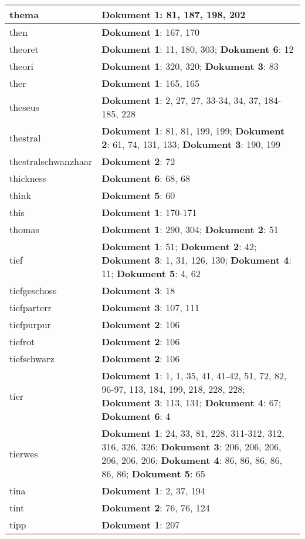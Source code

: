 \documentclass[a5paper]{article}
\begin{document}
\begin{longtable}[l]{|l|p{3in}|}
\hline
thema & \textbf{Dokument 1}: 81, 187, 198, 202 \\
\hline
then & \textbf{Dokument 1}: 167, 170 \\
\hline
theoret & \textbf{Dokument 1}: 11, 180, 303; \textbf{Dokument 6}: 12 \\
\hline
theori & \textbf{Dokument 1}: 320, 320; \textbf{Dokument 3}: 83 \\
\hline
ther & \textbf{Dokument 1}: 165, 165 \\
\hline
theseus & \textbf{Dokument 1}: 2, 27, 27, 33-34, 34, 37, 184-185, 228 \\
\hline
thestral & \textbf{Dokument 1}: 81, 81, 199, 199; \textbf{Dokument 2}: 61, 74, 131, 133; \textbf{Dokument 3}: 190, 199 \\
\hline
thestralschwanzhaar & \textbf{Dokument 2}: 72 \\
\hline
thickness & \textbf{Dokument 6}: 68, 68 \\
\hline
think & \textbf{Dokument 5}: 60 \\
\hline
this & \textbf{Dokument 1}: 170-171 \\
\hline
thomas & \textbf{Dokument 1}: 290, 304; \textbf{Dokument 2}: 51 \\
\hline
tief & \textbf{Dokument 1}: 51; \textbf{Dokument 2}: 42; \textbf{Dokument 3}: 1, 31, 126, 130; \textbf{Dokument 4}: 11; \textbf{Dokument 5}: 4, 62 \\
\hline
tiefgeschoss & \textbf{Dokument 3}: 18 \\
\hline
tiefparterr & \textbf{Dokument 3}: 107, 111 \\
\hline
tiefpurpur & \textbf{Dokument 2}: 106 \\
\hline
tiefrot & \textbf{Dokument 2}: 106 \\
\hline
tiefschwarz & \textbf{Dokument 2}: 106 \\
\hline
tier & \textbf{Dokument 1}: 1, 1, 35, 41, 41-42, 51, 72, 82, 96-97, 113, 184, 199, 218, 228, 228; \textbf{Dokument 3}: 113, 131; \textbf{Dokument 4}: 67; \textbf{Dokument 6}: 4 \\
\hline
tierwes & \textbf{Dokument 1}: 24, 33, 81, 228, 311-312, 312, 316, 326, 326; \textbf{Dokument 3}: 206, 206, 206, 206, 206, 206; \textbf{Dokument 4}: 86, 86, 86, 86, 86, 86; \textbf{Dokument 5}: 65 \\
\hline
tina & \textbf{Dokument 1}: 2, 37, 194 \\
\hline
tint & \textbf{Dokument 2}: 76, 76, 124 \\
\hline
tipp & \textbf{Dokument 1}: 207 \\

\end{longtable}
\end{document}
